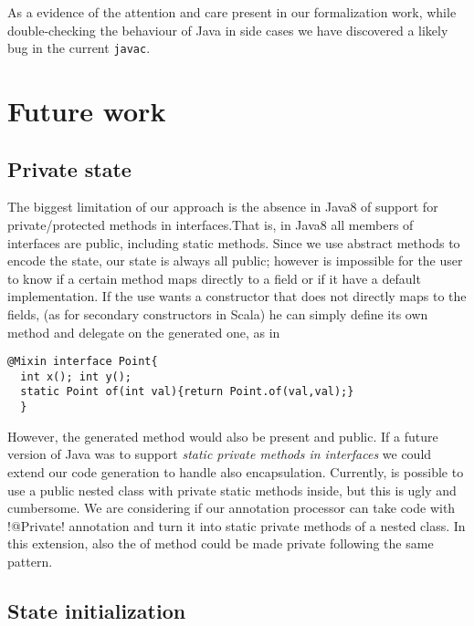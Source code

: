 As a evidence of the attention and care present in our formalization work, while double-checking the behaviour of Java in side cases we have discovered a likely bug in the current \texttt{javac}.

\section{Future work}

\subsection{Private state}
The biggest limitation of our approach is the absence in Java8 of support for private/protected methods in interfaces.That is, in Java8 all members of interfaces are public, including static methods.
Since we use abstract methods to encode the state, our state is always all public; however is impossible for the user to know if a certain method maps directly to a field or if it have a default implementation.
If the use wants a constructor that does not directly maps to the fields, (as for secondary constructors in Scala) he can simply define its own \Q@of@ method and delegate on the generated one, as in
\begin{lstlisting}
@Mixin interface Point{
  int x(); int y();
  static Point of(int val){return Point.of(val,val);}  
  }
\end{lstlisting}
However, the generated \Q@of@ method would also be present and public.
If a future version of Java was to support \emph{static private methods in interfaces} we could extend our code generation to handle also encapsulation.
Currently, is possible to use a public nested class with private static methods inside, but this is ugly and cumbersome. We are considering if our annotation processor can take code with \Q!@Private! annotation and turn it into static private methods of a nested class. In this extension,  also the of method could be made private following the same pattern. 

\subsection{State initialization}

